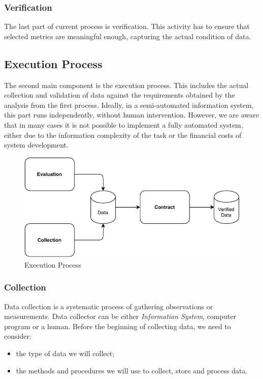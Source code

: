 \subsubsection{Verification}

The last part of current process is verification.
This activity has to ensure that selected metrics are meaningful enough, capturing the actual condition of data.

\subsection{Execution Process}

The second main component is the execution process.
This includes the actual collection and validation of data against the requirements obtained by the analysis from the first process.
Ideally, in a semi-automated information system, this part runs independently, without human intervention.
However, we are aware that in many cases it is not possible to implement a fully automated system, either due to the information complexity of the task or the financial costs of system development.

\begin{figure}[htb]
    \centering
    \includegraphics[width=.8\textwidth]{figures/execution-process.pdf}
    \caption{Execution Process}
    \label{fig:execution-process}
\end{figure}
\FloatBarrier

\subsubsection{Collection}

Data collection is a systematic process of gathering observations or measurements.
Data collector can be either \textit{Information System}, computer program or a human.
Before the beginning of collecting data, we need to consider:

\begin{itemize}
    \item the type of data we will collect;
    \item the methods and procedures we will use to collect, store and process data.
\end{itemize}

